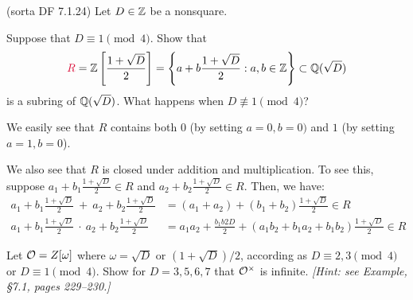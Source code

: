 
\begin{problem}{(\textsf{sorta DF 7.1.24})}
  Let $D \in \mathbb{Z}$ be a nonsquare.
  \begin{enumalph}
  \item Suppose that $D \equiv 1 \pmod{4}$.
    Show that
    \[ \crim{R} = \Z\left[\frac{1+\sqrt{D}}{2}\right]=\left\{a+b\frac{1+\sqrt{D}}{2}:a,b \in \Z \right\}
    \subset \Q(\sqrt{D}) \] is a subring of $\mathbb{Q}(\sqrt{D})$.
    What happens when $D \not\equiv 1 \pmod{4}$?
    \begin{Answer}
      \begin{enumalph}
        \item We easily see that $R$ contains both $0$ (by setting $a=0, b=0)$
          and $1$ (by setting $a=1, b=0$).
        \item We also see that $R$ is closed under addition and multiplication.
          To see this, suppose $a_1+b_1\frac{1+\sqrt{D}}{2} \in R$ and
          $a_2+b_2\frac{1+\sqrt{D}}{2} \in R$.
          Then, we have:
          \begin{align*}
            a_1+b_1\frac{1+\sqrt{D}}{2}\  + \ a_2+b_2\frac{1+\sqrt{D}}{2} &=
            (a_1+a_2) + (b_1+b_2)\frac{1+\sqrt{D}}{2} \in R \\
            a_1+b_1\frac{1+\sqrt{D}}{2} \ \cdot \ a_2+b_2\frac{1+\sqrt{D}}{2} &=
            a_1a_2+\frac{b_1b2D}{2} + (a_1b_2+b_1a_2 + b_1b_2)\frac{1+\sqrt{D}}{2} \in R
          \end{align*}
      \end{enumalph}
    \end{Answer}
  \item Let $\mathcal{O}=Z[\omega]$ where $\omega=\sqrt{D}$ or $(1+\sqrt{D})/2$,
    according as $D \equiv 2,3 \pmod{4}$ or $D \equiv 1 \pmod{4}$.
    Show for $D=3,5,6,7$ that $\mathcal{O}^\times$ is infinite.
    \emph{[Hint: see Example, \S 7.1, pages 229--230.]}
  \end{enumalph}
\end{problem}
